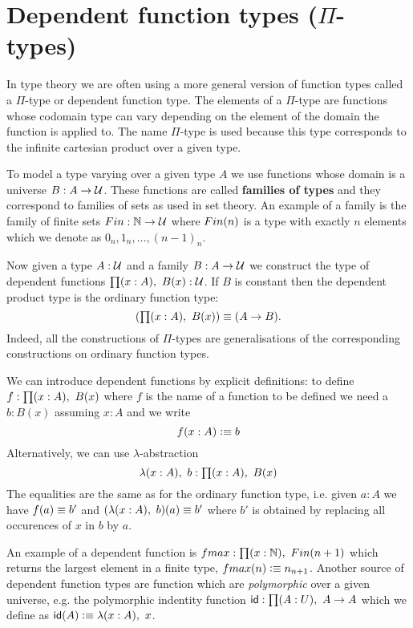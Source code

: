 
\section{Dependent function types (\texorpdfstring{$\Pi$}{Π}-types)}
\label{sec:pi-types}

In type theory we are often using a more general version of function
types called a $\Pi$-type or dependent function type. The elements of
a $\Pi$-type are functions whose codomain type can vary depending on the
element of the domain the function is applied to. The name $\Pi$-type
is used because this type corresponds to the infinite cartesian
product over a given type.

To model a type varying over a given type $A$ we use functions whose
domain is a universe $B : A \to \mathcal{U}$. These functions are called
\textbf{families of types} and they correspond to families of sets as used in
set theory. An example of a family is the family of finite sets $Fin
: \mathbb{N} \to \mathcal{U}$ where $Fin(n)$ is a type with exactly $n$ elements
which we denote as $0_n,1_n,\dots,(n-1)_n$. 

Now given a type $A:\mathcal{U}$ and a family $B:A \to \mathcal{U}$ we construct
the type of dependent functions $\prd{x:A}B(x) : \UU$. If $B$ is
constant then the dependent product type is the ordinary function type:
\[(\prd{x:A} B(x)) \jdeq (A \to B).\]
Indeed, all the constructions of $\Pi$-types are generalisations of the corresponding constructions on ordinary function types.

We can introduce dependent functions by explicit definitions: to
define $f : \prd{x:A}B(x)$ where $f$ is the name of a function to be
defined we need a $b : B(x)$ assuming $x:A$ and we write
\[ f(x : A) \vcentcolon\equiv b \]
Alternatively, we can use $\lambda$-abstraction 
\[ \lam{x:A} b : \prd{x:A} B(x) \]
The equalities are the same as for the ordinary function type, i.e.
given $a:A$ we have $f(a) \equiv b'$ and  
$(\lam{x:A} b)(a) \jdeq b'$ where $b' $ is obtained by replacing all
occurences of $x$ in $b$ by $a$.

An example of a dependent function is $\fmax : \prd{x:\nat} \Fin(n+1)$
which returns the largest element in a finite type, $fmax(n) \vcentcolon\equiv
n_{n+1}$. 
Another source of dependent function types
are function which are \emph{polymorphic} over a given universe,
e.g. the polymorphic indentity function $\idf : \prd{A:U} A \to A$
which we define as $\idf(A) \defeq \lam{x:A}x$.

